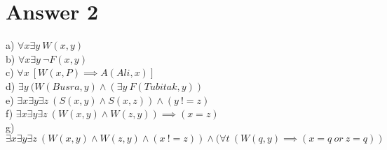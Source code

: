 \documentclass[12pt]{article}
\begin{document}
\section*{Answer 2}
a) $ \forall x \exists y \ W(x,y)$ \\
b) $ \forall x \exists y\ \neg F(x,y)$ \\
c) $ \forall x\ [W(x,P) \implies A(Ali,x)]$ \\
d) $ \exists y\ (W(Busra, y) \land  (\exists y \ F(Tubitak, y)) $ \\
e) $ \exists x \exists y \exists z \ (S(x,y) \land S(x,z)) \land (y\ != z)$ \\
f) $ \exists x \exists y \exists z \ (W(x,y) \land W(z,y)) \implies (x = z)$ \\
g) $ \exists x \exists y \exists z \ (W(x,y) \land W(z,y) \land (x\ != z)) \land (\forall t \ (W(q,y) \implies (x = q \ or \ z = q))$ \\ 
\end{document}

